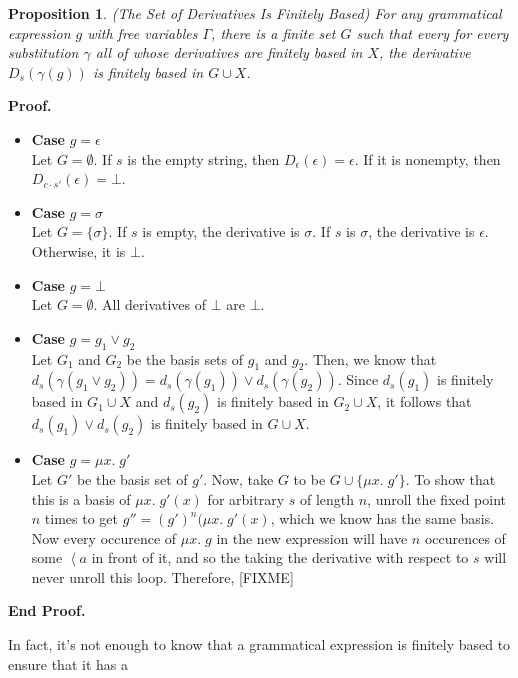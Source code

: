 \documentclass{article}
\newcommand{\fix}[2]{\mu {#1}.\;{#2}}
\newcommand{\lft}[1]{\left<{#1}\right.}
\newcommand{\setof}[1]{\{{#1}\}}
\newcommand{\deriv}[2]{d_{#1}({#2})}
\newtheorem{prop}{Proposition}
\newenvironment{proof}{\noindent\textbf{Proof.}}
{\noindent\textbf{End Proof.}}
\newenvironment{caseblock}{\begin{itemize}}{\end{itemize}}
\newenvironment{case}[1]{\item \textbf{Case} {#1}\\}{}
\begin{document}
\begin{prop}{(The Set of Derivatives Is Finitely Based)}
For any grammatical expression $g$ with free variables $\Gamma$, there
is a finite set $G$ such that every for every substitution $\gamma$ all of 
whose derivatives are finitely based in $X$, the derivative $D_s(\gamma(g))$ 
is finitely based in $G \cup X$.  
\end{prop}

\begin{proof}
\begin{caseblock}
  \begin{case}{$g = \epsilon$}
    Let $G = \emptyset$. If $s$ is the empty string, 
    then $D_\epsilon(\epsilon) = \epsilon$. If it is nonempty, then $D_{c\cdot s'}(\epsilon) = \bot$. 
  \end{case}

  \begin{case}{$g = \sigma$}
    Let $G = \setof{\sigma}$. If $s$ is empty, the derivative is $\sigma$. 
    If $s$ is $\sigma$, the derivative is $\epsilon$. Otherwise, it is $\bot$. 
  \end{case}

  \begin{case}{$g = \bot$}
    Let $G = \emptyset$. All derivatives of $\bot$ are $\bot$. 
  \end{case}

  \begin{case}{$g = g_1 \vee g_2$}
    Let $G_1$ and $G_2$ be the basis sets of $g_1$ and $g_2$. Then, we know 
    that $\deriv{s}{\gamma(g_1 \vee g_2)} = \deriv{s}{\gamma(g_1)} \vee \deriv{s}{\gamma(g_2)}$. Since
    $\deriv{s}{g_1}$ is finitely based in $G_1 \cup X$ and $\deriv{s}{g_2}$ is finitely based in $G_2 \cup X$, 
    it follows that $\deriv{s}{g_1} \vee \deriv{s}{g_2}$ is finitely based in $G \cup X$. 
  \end{case}

  \begin{case}{$g = \fix{x}{g'}$}
    Let $G'$ be the basis set of $g'$. Now, take $G$ to be $G \cup \setof{\fix{x}{g'}}$. 
    To show that this is a basis of $\fix{x}{g'(x)}$ for arbitrary $s$ of length $n$, unroll
    the fixed point $n$ times to get $g'' = (g')^n(\fix{x}{g'(x)}$, which we know has the same basis. 
    Now every occurence of $\fix{x}{g}$ in the new expression will have $n$ occurences of some 
    $\lft{a}$ in front of it, and so the taking the derivative with respect to $s$ will never 
    unroll this loop. Therefore, [FIXME]
  \end{case}
\end{caseblock}
\end{proof}

In fact, it's not enough to know that a grammatical expression is
finitely based to ensure that it has a
\end{document}
